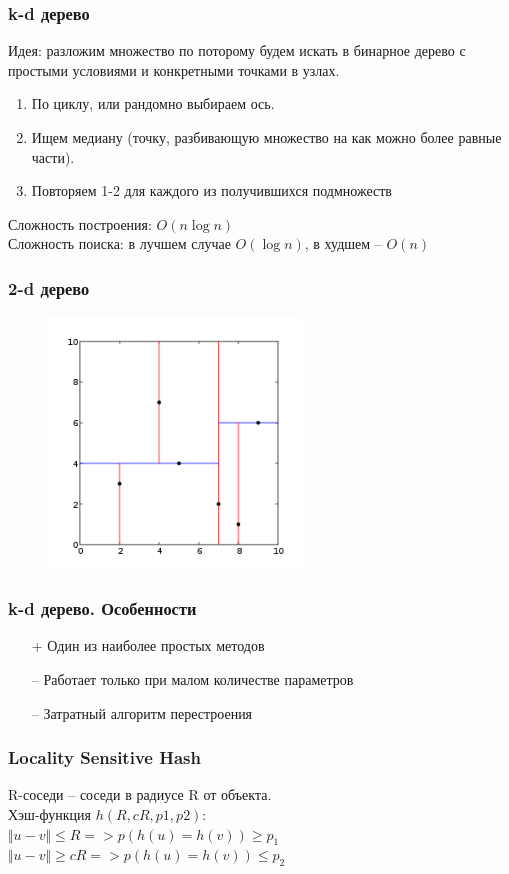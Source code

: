 \documentclass[12pt]{beamer}
\begin{document}
\begin{frame}\frametitle{k-d дерево}
Идея: разложим множество по поторому будем искать
в бинарное дерево с простыми условиями и
конкретными точками в узлах.
\vspace{5mm}
\begin{enumerate}
\item По циклу, или рандомно выбираем ось.
\item Ищем медиану (точку, разбивающую множество на как
можно более равные части).
\item Повторяем 1-2 для каждого из получившихся подмножеств 
\end{enumerate}
Сложность построения: $O(n\log n)$\\
Сложность поиска: в лучшем
случае $O(\log n)$, в худшем -- $O(n)$
\end{frame}
\begin{frame}\frametitle{2-d дерево}

\begin{figure}[htbp]
\centering
\includegraphics[height=190pt]{images/Kdtree_2d}  
\end{figure}
\end{frame}

\begin{frame}\frametitle{k-d дерево. Особенности}
\begin{itemize}
\item[+] Один из наиболее простых методов
\item[--] Работает только при малом количестве параметров
\item[--] Затратный алгоритм перестроения

\end{itemize}
\end{frame}

\begin{frame}\frametitle{Locality Sensitive Hash}
R-соседи -- соседи в радиусе R от объекта.\\
\vspace{5mm}
Хэш-функция $h(R, cR, p1, p2)$:\\
$\Vert u - v \Vert  \leq R => p(h(u) = h(v)) \geq p_1$ \\
$\Vert u - v \Vert  \geq cR => p(h(u) = h(v)) \leq p_2$ 
\end{frame}
\end{document}
